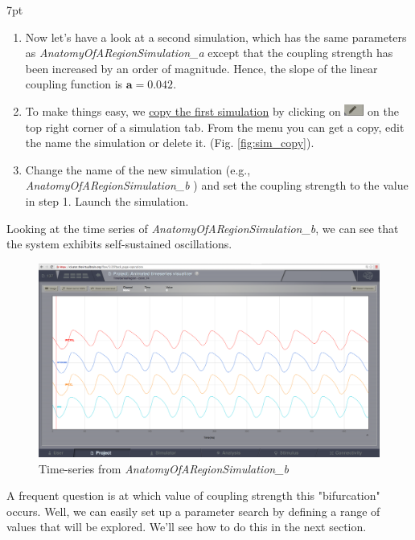 \documentclass{tufte-handout}
\newenvironment{simulation}{%
  \def\FrameCommand{%
    \hspace{1pt}%
    {\color{ForestGreen}\vrule width 2pt}%
    {\color{simulationshade}\vrule width 4pt}%
    \colorbox{simulationshade}%
  }%
  \MakeFramed{\advance\hsize-\width\FrameRestore}%
  \noindent\hspace{-4.55pt}%
  \begin{adjustwidth}{}{7pt}%
  \vspace{2pt}\vspace{2pt}%
}
{%
  \vspace{2pt}\end{adjustwidth}\endMakeFramed%
}
\begin{document}
\begin{simulation}
\begin{enumerate}
\item Now let's have a look at a second simulation, which has the same parameters as \textit{AnatomyOfARegionSimulation\_a} except that
the coupling strength has been increased by an order of magnitude. Hence, the slope of the linear coupling function is  $\mathbf{a=0.042}$.
\item To make things easy, we \underline{copy the first simulation} by clicking on \includegraphics[width=0.05\textwidth]{butt_pencil.png} on the top right corner of a simulation tab. From the menu you can get a copy, edit the name the simulation or delete it. (Fig. \ref{fig:sim_copy}).
\item Change the name of the new simulation (e.g., \textit{AnatomyOfARegionSimulation\_b} ) and set the coupling strength to the value in step 1. Launch the simulation.
\end{enumerate}
\end{simulation}


Looking at the time series of \textit{AnatomyOfARegionSimulation\_b}, we can see that the system exhibits self-sustained
oscillations. 

\begin{figure}[h]
  \includegraphics[width=\linewidth]{Handout_UI_BuildingYourOwnBrainNetworkModel_AnimatedTimeSeriesOscillatory}%
  \caption{Time-series from \textit{AnatomyOfARegionSimulation\_b}}%
  \label{fig:time_series_oscillatory}%
\end{figure}


A frequent question is at which value of coupling strength this "bifurcation"
occurs. Well, we can easily set up a parameter search by defining a range of
values that will be explored. We'll see how to do this in the next section.
\end{document}
